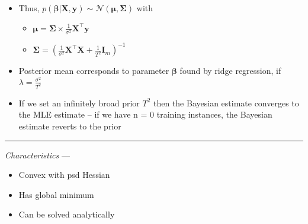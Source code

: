 \begin{itemize}
    \item Thus, $p( \boldsymbol{\beta} | \boldsymbol{X}, \boldsymbol{y} ) \sim \mathcal{N}(\boldsymbol{\mu}, \boldsymbol{\Sigma})$ with
    \begin{itemize}
        \item $\boldsymbol{\mu} = \boldsymbol{\Sigma} \times \frac{1}{\sigma^2} \boldsymbol{X}^\intercal \boldsymbol{y}$
        \item $\boldsymbol{\Sigma} = ( \frac{1}{\sigma^2} \boldsymbol{X}^\intercal \boldsymbol{X} + \frac{1}{T^2} \boldsymbol{I}_m )^{-1}$
    \end{itemize}
    \item Posterior mean corresponds to parameter $\boldsymbol{\beta}$ found by ridge regression, if $\lambda = \frac{\sigma^2}{T^2}$
    \item If we set an infinitely broad prior $T^2$ then the Bayesian estimate converges to the MLE estimate – if we have n = 0 training instances, the Bayesian estimate reverts to the prior 
\end{itemize}

{\color{lightgray}\hrule height 0.001mm}

\emph{Characteristics} --- 
\begin{itemize}
    \item Convex with psd Hessian
    \item Has global minimum
    \item Can be solved analytically 
\end{itemize}